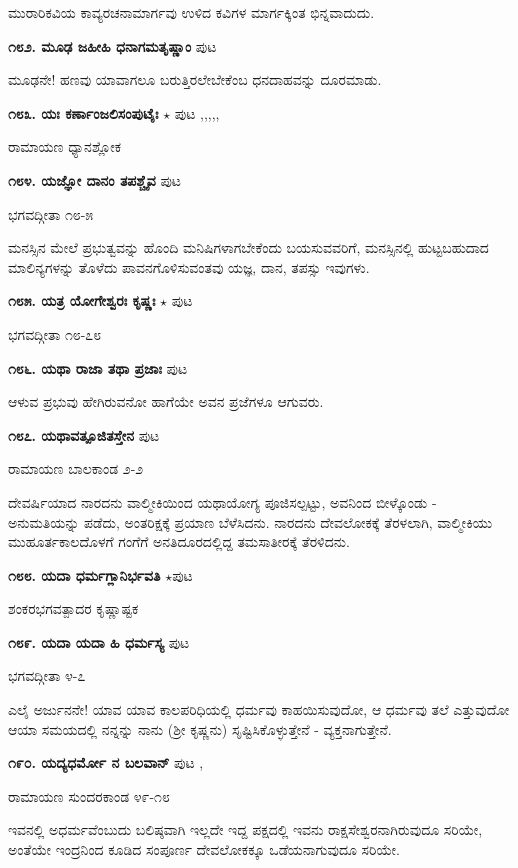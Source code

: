 ಮುರಾರಿಕವಿಯ ಕಾವ್ಯರಚನಾಮಾರ್ಗವು ಉಳಿದ ಕವಿಗಳ ಮಾರ್ಗಕ್ಕಿಂತ ಭಿನ್ನವಾದುದು.

\medskip
\noindent\textbf{೧೮೨. ಮೂಢ ಜಹೀಹಿ ಧನಾಗಮತೃಷ್ಣಾಂ} \hfill ಪುಟ \pageref{55}

ಮೂಢನೇ! ಹಣವು ಯಾವಾಗಲೂ ಬರುತ್ತಿರಲೇಬೇಕೆಂಬ ಧನದಾಹವನ್ನು ದೂರಮಾಡು.

\medskip
\noindent\textbf{೧೮೩. ಯಃ ಕರ್ಣಾಂಜಲಿಸಂಪುಟೈಃ} $\star$  \hfill ಪುಟ \pageref{152},\pageref{168},\pageref{181},\pageref{208},\pageref{211},\pageref{244}

\hfill ರಾಮಾಯಣ ಧ್ಯಾನಶ್ಲೋಕ 

\medskip
\noindent\textbf{೧೮೪. ಯಜ್ಞೋ ದಾನಂ ತಪಶ್ಚೈವ} \hfill ಪುಟ \pageref{172}

\hfill ಭಗವದ್ಗೀತಾ ೧೮-೫

ಮನಸ್ಸಿನ ಮೇಲೆ ಪ್ರಭುತ್ವವನ್ನು ಹೊಂದಿ ಮನಿಷಿಗಳಾಗಬೇಕೆಂದು ಬಯಸುವವರಿಗೆ, ಮನಸ್ಸಿನಲ್ಲಿ ಹುಟ್ಟಬಹುದಾದ ಮಾಲಿನ್ಯಗಳನ್ನು ತೊಳೆದು ಪಾವನಗೊಳಿಸುವಂತವು ಯಜ್ಞ, ದಾನ, ತಪಸ್ಸು ಇವುಗಳು.

\medskip
\noindent\textbf{೧೮೫. ಯತ್ರ ಯೋಗೇಶ್ವರಃ ಕೃಷ್ಣಃ} $\star$ \hfill ಪುಟ \pageref{92}

\hfill ಭಗವದ್ಗೀತಾ ೧೮-೭೮

\medskip
\noindent\textbf{೧೮೬. ಯಥಾ ರಾಜಾ ತಥಾ ಪ್ರಜಾಃ} \hfill ಪುಟ \pageref{225}

ಆಳುವ ಪ್ರಭುವು ಹೇಗಿರುವನೋ ಹಾಗೆಯೇ ಅವನ ಪ್ರಜೆಗಳೂ ಆಗುವರು.

\medskip
\noindent\textbf{೧೮೭. ಯಥಾವತ್ಪೂಜಿತಸ್ತೇನ} \hfill ಪುಟ \pageref{197}

\hfill ರಾಮಾಯಣ ಬಾಲಕಾಂಡ ೨-೨

ದೇವರ್ಷಿಯಾದ ನಾರದನು ವಾಲ್ಮೀಕಿಯಿಂದ ಯಥಾಯೋಗ್ಯ ಪೂಜಿಸಲ್ಪಟ್ಟು, ಅವನಿಂದ ಬೀಳ್ಕೊಂಡು - ಅನುಮತಿಯನ್ನು ಪಡೆದು, ಅಂತರಿಕ್ಷಕ್ಕೆ ಪ್ರಯಾಣ ಬೆಳೆಸಿದನು. ನಾರದನು ದೇವಲೋಕಕ್ಕೆ  ತೆರಳಲಾಗಿ, ವಾಲ್ಮೀಕಿಯು ಮುಹೂರ್ತಕಾಲದೊಳಗೆ ಗಂಗೆಗೆ ಅನತಿದೂರದಲ್ಲಿದ್ದ ತಮಸಾತೀರಕ್ಕೆ ತೆರಳಿದನು.

\medskip
\noindent\textbf{೧೮೮. ಯದಾ ಧರ್ಮಗ್ಲಾನಿರ್ಭವತಿ} $\star$\hfill ಪುಟ \pageref{150}

\hfill ಶಂಕರಭಗವತ್ಪಾದರ ಕೃಷ್ಣಾಷ್ಟಕ

\medskip
\noindent\textbf{೧೮೯. ಯದಾ ಯದಾ ಹಿ ಧರ್ಮಸ್ಯ} \hfill ಪುಟ \pageref{226}

\hfill ಭಗವದ್ಗೀತಾ ೪-೭

ಎಲೈ ಅರ್ಜುನನೇ! ಯಾವ ಯಾವ ಕಾಲಪರಿಧಿಯಲ್ಲಿ ಧರ್ಮವು ಕಾಹಯಿಸುವುದೋ, ಆ ಧರ್ಮವು ತಲೆ  ಎತ್ತುವುದೋ ಆಯಾ ಸಮಯದಲ್ಲಿ ನನ್ನನ್ನು ನಾನು (ಶ್ರೀ ಕೃಷ್ಣನು) ಸೃಷ್ಟಿಸಿಕೊಳ್ಳುತ್ತೇನೆ - ವ್ಯಕ್ತನಾಗುತ್ತೇನೆ.

\medskip
\noindent\textbf{೧೯೦. ಯದ್ಯಧರ್ಮೋ ನ ಬಲವಾನ್} \hfill ಪುಟ \pageref{192},\pageref{215}

\hfill ರಾಮಾಯಣ ಸುಂದರಕಾಂಡ ೪೯-೧೮

ಇವನಲ್ಲಿ ಅಧರ್ಮವೆಂಬುದು ಬಲಿಷ್ಠವಾಗಿ ಇಲ್ಲದೇ ಇದ್ದ ಪಕ್ಷದಲ್ಲಿ ಇವನು ರಾಕ್ಷಸೇಶ್ವರನಾಗಿರುವುದೂ ಸರಿಯೇ, ಅಂತೆಯೇ ಇಂದ್ರನಿಂದ ಕೂಡಿದ ಸಂಪೂರ್ಣ ದೇವಲೋಕಕ್ಕೂ ಒಡೆಯನಾಗುವುದೂ ಸರಿಯೇ.

